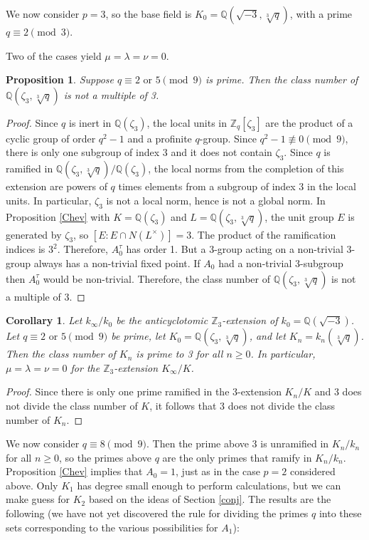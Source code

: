 \documentclass{amsart}
\newtheorem{proposition}[theorem]{Proposition}
\newtheorem{corollary}[theorem]{Corollary}
\begin{document}
\medskip

We now consider $p=3$, so the base field is $K_0=\mathbb Q(\sqrt{-3}, \sqrt[3]{q})$, with a prime $q\equiv 2\pmod 3$.

Two of the cases yield $\mu=\lambda=\nu=0$.
\begin{proposition} Suppose $q\equiv 2 \text{ or } 5\pmod 9$ is prime. 
Then the class number of $\mathbb Q(\zeta_3, \sqrt[3]{q})$ is not a multiple of 3.
\end{proposition}
\begin{proof} Since $q$ is inert in $\mathbb Q(\zeta_3)$, the local units in $\mathbb Z_q[\zeta_3]$ are the product of a cyclic group of
order $q^2-1$ and a profinite $q$-group. Since $q^2-1\not\equiv 0\pmod 9$, there is only one subgroup of index 3 and it does not contain
$\zeta_3$. Since $q$ is ramified in $\mathbb Q(\zeta_3, \sqrt[3]{q})/\mathbb Q(\zeta_3)$, the local norms from the completion of
this extension are powers of $q$ times elements from a subgroup of index 3 in the local units. In  particular, $\zeta_3$ is not a local
norm, hence is not a global norm. In Proposition \ref{Chev} with $K=\mathbb Q(\zeta_3)$ and $L=\mathbb Q(\zeta_3, \sqrt[3]{q})$,
the unit group $E$ is generated by $\zeta_3$, so $[E : E\cap N(L^{\times})] = 3$. The product of the ramification indices is $3^2$.
Therefore, $A_0^{\tau}$ has order 1. But a 3-group acting on a non-trivial 3-group always has a non-trivial fixed point. 
If $A_0$ had a non-trivial 3-subgroup
then $A_0^{\tau}$ would be non-trivial. Therefore, the class number of $\mathbb Q(\zeta_3, \sqrt[3]{q})$ is not a multiple of 3. \end{proof}

\begin{corollary} Let $k_{\infty}/k_0$ be the anticyclotomic $\mathbb Z_3$-extension of $k_0=\mathbb Q(\sqrt{-3})$. Let $q\equiv 2 \text{ or } 5\pmod 9$ be prime, let $K_0= \mathbb Q(\zeta_3, \sqrt[3]{q})$,
and let $K_n=k_n(\sqrt[3]{q})$. Then the class number of $K_n$ is prime to 3 for all $n\ge 0$.
In particular, $\mu=\lambda=\nu=0$ for the $\mathbb Z_3$-extension $K_{\infty}/K$.
\end{corollary}
\begin{proof} Since there is only one prime ramified in the 3-extension $K_n/K$ and 3 does not divide the class number of $K$,
it follows that 3 does not divide the class number of $K_n$. \end{proof}

We now consider $q\equiv 8\pmod 9$. Then the prime above 3 is unramified in $K_n/k_n$ for all $n\ge 0$, so the primes above $q$ are the only primes that ramify in $K_n/k_n$. Proposition \ref{Chev}
implies that $A_0=1$, just as in the case $p=2$ considered above. Only $K_1$ has degree small enough to perform calculations, but we can make guess for $K_2$ based on the ideas of Section \ref{conj}. The results are the following
(we have not yet discovered the rule for dividing the primes $q$ into these sets corresponding to the various possibilities for $A_1$):
\end{document}
